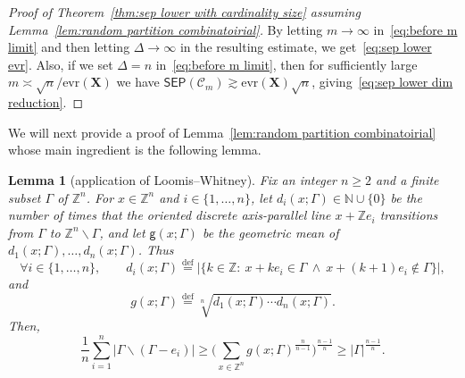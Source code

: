\documentclass[11pt,reqno]{amsart}
\renewcommand{\ge}{\geqslant}
\renewcommand{\setminus}{\smallsetminus}
\newcommand{\evr}{\mathrm{evr}}
\newcommand{\n}{\{1,\ldots,n\}}
\newcommand{\X}{\mathbf X}
\newtheorem{lemma}[theorem]{Lemma}
\theoremstyle{remark}
\newcommand{\N}{\mathbb N}
\newcommand{\Z}{\mathbb Z}
\newcommand{\eqdef}{\stackrel{\mathrm{def}}{=}}
\newcommand{\sub}{\mathscr{C}}
\renewcommand{\1}{\mathbf 1}
\newcommand{\sep}{\mathsf{SEP}}
\newcommand{\g}{\mathsf{g}}
\begin{document}
\begin{proof}[Proof of Theorem~\ref{thm:sep lower with cardinality size} assuming Lemma~\ref{lem:random partition combinatoirial}]
By letting $m\to \infty$ in~\eqref{eq:before m limit} and then letting $\Delta\to \infty$ in the resulting estimate, we get~\eqref{eq:sep lower evr}. Also, if we set $\Delta=n$ in~\eqref{eq:before m limit}, then for sufficiently large  $m\asymp \sqrt{n}/\evr(\X)$ we have $\sep(\sub_m)\gtrsim   \evr(\X)\sqrt{n}$, giving~\eqref{eq:sep lower dim reduction}.
\end{proof}

We will next provide a proof of Lemma~\ref{lem:random partition combinatoirial} whose  main ingredient is the following lemma.

\begin{lemma}[application of Loomis--Whitney]\label{lem:Use LW} Fix an integer $n\ge 2$ and a finite subset $\Gamma$ of $\Z^n$. For  $x\in \Z^n$ and $i\in \n$, let $d_i(x;\Gamma)\in \N\cup\{0\}$ be the number of times that the oriented discrete axis-parallel line $x+\Z e_i$ transitions from $\Gamma$ to  $\Z^n\setminus \Gamma$, and let $\g(x;\Gamma)$ be the geometric mean of $d_1(x;\Gamma),\ldots,d_n(x;\Gamma)$. Thus
$$
\forall i\in \n,\qquad d_i(x;\Gamma)\eqdef \big|\{k\in \Z:\ x+ke_i\in \Gamma\ \wedge\ x+(k+1)e_i\notin \Gamma\}\big|,
$$
and
$$
g(x;\Gamma)\eqdef \sqrt[n]{d_1(x;\Gamma)\cdots d_n(x;\Gamma)}.
$$
Then,
\begin{equation}\label{eq:loomis whitney to use}
\frac{1}{n}\sum_{i=1}^n|\Gamma\setminus(\Gamma-e_i)|\ge \bigg(\sum_{x\in \Z^n} g(x;\Gamma)^{\frac{n}{n-1}}\bigg)^{\frac{n-1}{n}}\ge |\Gamma|^{\frac{n-1}{n}}.
\end{equation}
\end{lemma}
\end{document}

